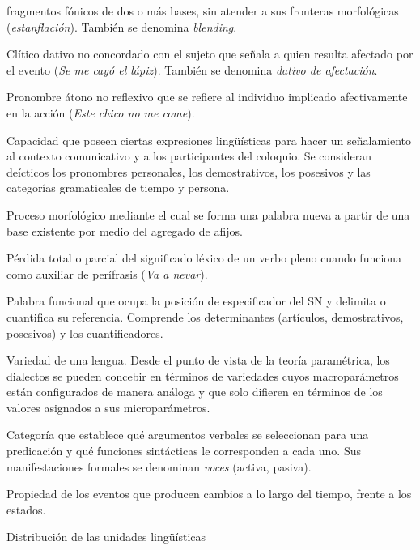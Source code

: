 \begin{glosariogeneral}
        fragmentos fónicos de dos o más bases, sin atender a sus fronteras
        morfológicas (\textit{estanflación}). También se denomina
        \textit{blending}.
  \item[Dativo afectado:] Clítico dativo no concordado con el sujeto que
        señala a quien resulta afectado por el evento (\textit{Se me cayó el
        lápiz}). También se denomina \textit{dativo de afectación}.
  \item[Dativo ético:] Pronombre átono no reflexivo que se refiere al
        individuo implicado afectivamente en la acción (\textit{Este chico no me
        come}).
  \item[Deixis:] Capacidad que poseen ciertas expresiones lingüísticas para
        hacer un señalamiento al contexto comunicativo y a los participantes del
        coloquio. Se consideran deícticos los pronombres personales, los
        demostrativos, los posesivos y las categorías gramaticales de tiempo y
        persona.
  \item[Derivación:] Proceso morfológico mediante el cual se forma una palabra
        nueva a partir de una base existente por medio del agregado de afijos.
  \item[Desemantización:] Pérdida total o parcial del significado léxico de un
        verbo pleno cuando funciona como auxiliar de perífrasis (\textit{Va a
        nevar}).
  \item[Determinativo:] Palabra funcional que ocupa la posición de
        especificador del SN y delimita o cuantifica su referencia. Comprende los
        determinantes (artículos, demostrativos, posesivos) y los
        cuantificadores.
  \item[Dialecto:] Variedad de una lengua. Desde el punto de vista de la teoría
        paramétrica, los dialectos se pueden concebir en términos de variedades
        cuyos macroparámetros están configurados de manera análoga y que solo
        difieren en términos de los valores asignados a sus microparámetros.
  \item[Diátesis:] Categoría que establece qué argumentos verbales se
        seleccionan para una predicación y qué funciones sintácticas le
        corresponden a cada uno. Sus manifestaciones formales se denominan
        \textit{voces} (activa, pasiva).
  \item[Dinamicidad:] Propiedad de los eventos que producen cambios a lo largo
        del tiempo, frente a los estados.
  \item[Distribución complementaria:] Distribución de las unidades lingüísticas

\end{glosariogeneral}
